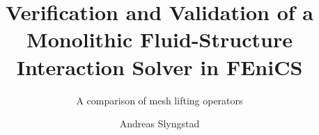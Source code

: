 \documentclass[a4paper, twoside,openright ,titlepage, 12pt]{book}
\title{Verification and Validation of a Monolithic Fluid-Structure Interaction Solver in FEniCS}
\subtitle{A comparison of mesh lifting operators}
\author{Andreas Slyngstad}
\begin{document}
                                                                                                                          
\masterfrontpage

\tableofcontents
\newtheorem{theorem}{Theorem}[section]
\newtheorem{lemma}[theorem]{Lemma}



\newpage


\newpage

\newpage

\newpage





\end{document}
